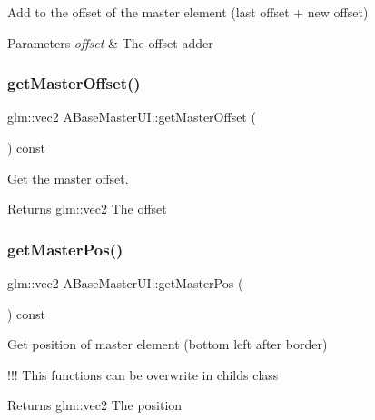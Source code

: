 Add to the offset of the master element (last offset + new offset) 


\begin{DoxyParams}{Parameters}
{\em offset} & The offset adder \\
\hline
\end{DoxyParams}
\mbox{\label{class_a_base_master_u_i_aeeea67741ab77e3d03c6a817fc3bb949}} 
\subsubsection{\texorpdfstring{get\+Master\+Offset()}{getMasterOffset()}}
{\footnotesize\ttfamily glm\+::vec2 A\+Base\+Master\+U\+I\+::get\+Master\+Offset (\begin{DoxyParamCaption}{ }\end{DoxyParamCaption}) const\hspace{0.3cm}{\ttfamily [virtual]}}



Get the master offset. 

\begin{DoxyReturn}{Returns}
glm\+::vec2 The offset 
\end{DoxyReturn}
\mbox{\label{class_a_base_master_u_i_aec1bb7871f82b2bd41de4fe4486e4050}} 
\subsubsection{\texorpdfstring{get\+Master\+Pos()}{getMasterPos()}}
{\footnotesize\ttfamily glm\+::vec2 A\+Base\+Master\+U\+I\+::get\+Master\+Pos (\begin{DoxyParamCaption}{ }\end{DoxyParamCaption}) const\hspace{0.3cm}{\ttfamily [virtual]}}



Get position of master element (bottom left after border) 

!!! This functions can be overwrite in childs class

\begin{DoxyReturn}{Returns}
glm\+::vec2 The position 
\end{DoxyReturn}



